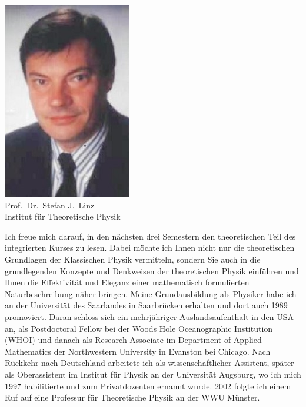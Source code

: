 \begin{multicols}{2}
\begin{center}
\includegraphics[width=0.71\columnwidth]{res/vorstellungsfotos/linz.jpg}\\
Prof.\ Dr.\ Stefan J.~Linz\\
Institut für Theoretische Physik
\end{center}

Ich freue mich darauf, in den nächsten drei Semestern den theoretischen Teil des integrierten Kurses zu lesen. Dabei möchte ich Ihnen nicht nur die theoretischen Grundlagen der Klassischen Physik vermitteln, sondern Sie auch in die grundlegenden Konzepte und Denkweisen der
theoretischen Physik einführen und Ihnen die Effektivität und Eleganz einer mathematisch formulierten Naturbeschreibung näher bringen. Meine Grundausbildung als Physiker habe ich an der Universität des Saarlandes in Saarbrücken erhalten und dort auch 1989 promoviert. Daran schloss sich ein mehrjähriger Auslandsaufenthalt in den USA an, als Postdoctoral Fellow bei der Woods Hole Oceanographic Institution (WHOI) und danach als Research Associate im Department of Applied Mathematics der Northwestern University in Evanston bei Chicago. Nach Rückkehr nach Deutschland arbeitete ich als wissenschaftlicher Assistent, später als Oberassistent im Institut für Physik an der Universität Augsburg, wo ich mich 1997 habilitierte und zum Privatdozenten ernannt wurde. 2002 folgte ich einem Ruf auf eine Professur für Theoretische Physik an der WWU Münster.


\end{multicols}
